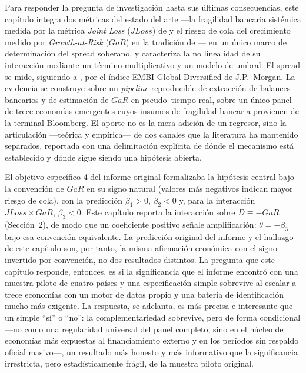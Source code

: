 Para responder la pregunta de investigación hasta sus últimas consecuencias, este capítulo integra dos métricas del estado del arte —la fragilidad bancaria sistémica medida por la métrica \textit{Joint Loss} ($JLoss$) de \citet{Chari2024b} y el riesgo de cola del crecimiento medido por \textit{Growth-at-Risk} ($GaR$) en la tradición de \citet{ABG2019b}— en un único marco de determinación del spread soberano, y caracteriza la no linealidad de su interacción mediante un término multiplicativo y un modelo de umbral. El spread se mide, siguiendo a \citet{Chari2024b}, por el índice EMBI Global Diversified de J.P.\ Morgan. La evidencia se construye sobre un \textit{pipeline} reproducible de extracción de balances bancarios y de estimación de $GaR$ en pseudo--tiempo real, sobre un único panel de trece economías emergentes cuyos insumos de fragilidad bancaria provienen de la terminal Bloomberg. El aporte no es la mera adición de un regresor, sino la articulación —teórica y empírica— de dos canales que la literatura ha mantenido separados, reportada con una delimitación explícita de dónde el mecanismo está establecido y dónde sigue siendo una hipótesis abierta.

El objetivo específico 4 del informe original formalizaba la hipótesis central bajo la convención de $GaR$ en su signo natural (valores más negativos indican mayor riesgo de cola), con la predicción $\beta_1>0$, $\beta_2<0$ y, para la interacción $JLoss\times GaR$, $\beta_3<0$. Este capítulo reporta la interacción sobre $D\equiv-GaR$ (Sección~2), de modo que un coeficiente positivo señale amplificación: $\theta=-\beta_3$ bajo esa convención equivalente. La predicción original del informe y el hallazgo de este capítulo son, por tanto, la misma afirmación económica con el signo invertido por convención, no dos resultados distintos. La pregunta que este capítulo responde, entonces, es si la significancia que el informe encontró con una muestra piloto de cuatro países y una especificación simple sobrevive al escalar a trece economías con un motor de datos propio y una batería de identificación mucho más exigente. La respuesta, se adelanta, es más precisa e interesante que un simple ``sí'' o ``no'': la complementariedad sobrevive, pero de forma condicional —no como una regularidad universal del panel completo, sino en el núcleo de economías más expuestas al financiamiento externo y en los períodos sin respaldo oficial masivo—, un resultado más honesto y más informativo que la significancia irrestricta, pero estadísticamente frágil, de la muestra piloto original.

